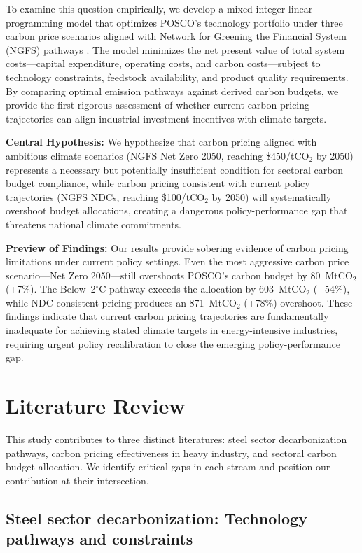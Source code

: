 \documentclass[preprint,1p,authoryear]{elsarticle}
\begin{document}
To examine this question empirically, we develop a mixed-integer linear programming model that optimizes POSCO's technology portfolio under three carbon price scenarios aligned with Network for Greening the Financial System (NGFS) pathways \citep{NGFS2024}. The model minimizes the net present value of total system costs—capital expenditure, operating costs, and carbon costs—subject to technology constraints, feedstock availability, and product quality requirements. By comparing optimal emission pathways against derived carbon budgets, we provide the first rigorous assessment of whether current carbon pricing trajectories can align industrial investment incentives with climate targets.

\textbf{Central Hypothesis:} We hypothesize that carbon pricing aligned with ambitious climate scenarios (NGFS Net Zero 2050, reaching \$450/tCO$_2$ by 2050) represents a necessary but potentially insufficient condition for sectoral carbon budget compliance, while carbon pricing consistent with current policy trajectories (NGFS NDCs, reaching \$100/tCO$_2$ by 2050) will systematically overshoot budget allocations, creating a dangerous policy-performance gap that threatens national climate commitments.

\textbf{Preview of Findings:} Our results provide sobering evidence of carbon pricing limitations under current policy settings. Even the most aggressive carbon price scenario—Net Zero 2050—still overshoots POSCO's carbon budget by 80~MtCO$_2$ (+7\%). The Below~2$^\circ$C pathway exceeds the allocation by 603~MtCO$_2$ (+54\%), while NDC-consistent pricing produces an 871~MtCO$_2$ (+78\%) overshoot. These findings indicate that current carbon pricing trajectories are fundamentally inadequate for achieving stated climate targets in energy-intensive industries, requiring urgent policy recalibration to close the emerging policy-performance gap.

\section{Literature Review}

This study contributes to three distinct literatures: steel sector decarbonization pathways, carbon pricing effectiveness in heavy industry, and sectoral carbon budget allocation. We identify critical gaps in each stream and position our contribution at their intersection.

\subsection{Steel sector decarbonization: Technology pathways and constraints}
\end{document}

